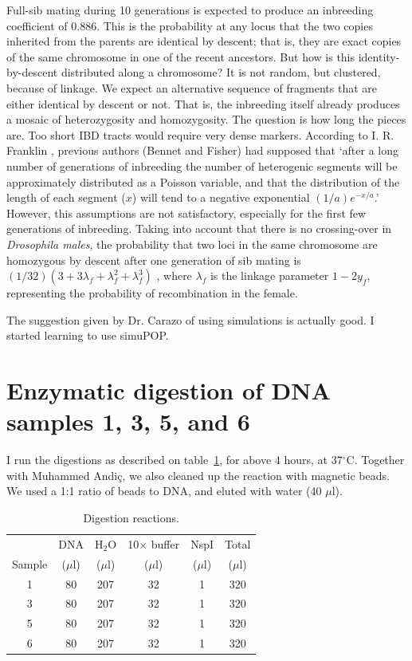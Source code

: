 \documentclass[a4paper,12pt]{article}
\begin{document}
Full-sib mating during 10 generations is expected to produce an inbreeding coefficient of 0.886. This is the probability at any locus that the two copies inherited from the parents are identical by descent; that is, they are exact copies of the same chromosome in one of the recent ancestors. But how is this identity-by-descent distributed along a chromosome? It is not random, but clustered, because of linkage. We expect an alternative sequence of fragments that are either identical by descent or not. That is, the inbreeding itself already produces a mosaic of heterozygosity and homozygosity. The question is how long the pieces are. Too short IBD tracts would require very dense markers. According to I. R. Franklin \cite{Franklin1977}, previous authors (Bennet and Fisher) had supposed that `after a long number of generations of inbreeding the number of heterogenic segments will be approximately distributed as a Poisson variable, and that the distribution of the length of each segment ($x$) will tend to a negative exponential $(1/a)e^{-x/a}$.' However, this assumptions are not satisfactory, especially for the first few generations of inbreeding. Taking into account that there is no crossing-over in \emph{Drosophila males}, the probability that two loci in the same chromosome are homozygous by descent after one generation of sib mating is $(1/32)(3 + 3\lambda_f + \lambda^2_f + \lambda^3_f)$ \cite{Franklin1977}, where $\lambda_f$ is the linkage parameter $1-2y_f$, representing the probability of recombination in the female.

The suggestion given by Dr. Carazo of using simulations is actually good. I started learning to use simuPOP.

\section{Enzymatic digestion of DNA samples 1, 3, 5, and 6}
I run the digestions as described on table~\ref{tau:digestion}, for above 4 hours, at 37$^\circ$C. Together with Muhammed Andiç, we also cleaned up the reaction with magnetic beads. We used a 1:1 ratio of beads to DNA, and eluted with water (40 $\mu$l). 

\begin{table}
\begin{center}
\caption{Digestion reactions.}\label{tau:digestion}
\vspace*{0.3cm}
\begin{tabular}{cccccc}
\toprule
      &DNA&H$_2$O&10$\times$ buffer&NspI&Total\\
Sample&($\mu$l)&($\mu$l)&($\mu$l)&($\mu$l)&($\mu$l)\\
\midrule
1&80&207&32&1&320\\
3&80&207&32&1&320\\
5&80&207&32&1&320\\
6&80&207&32&1&320\\
\bottomrule
\end{tabular}
\end{center}
\end{table}
\end{document}
